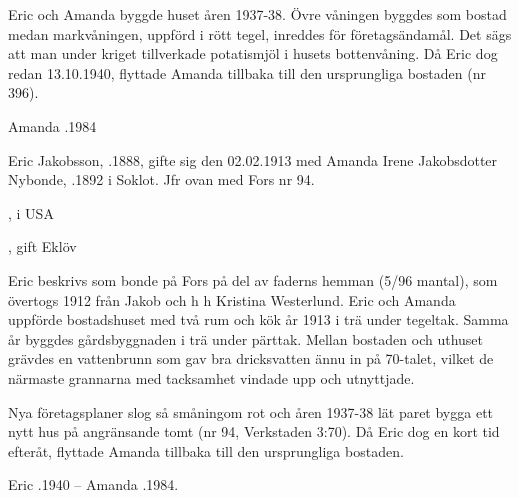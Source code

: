 Eric och Amanda byggde huset åren 1937-38. Övre våningen byggdes som bostad medan markvåningen, uppförd i rött tegel, inreddes för 	företagsändamål. Det sägs att man under kriget tillverkade potatismjöl i husets  bottenvåning. Då Eric dog redan 13.10.1940, flyttade Amanda tillbaka till den ursprungliga bostaden (nr 396).


Amanda .1984










Eric Jakobsson, .1888,  gifte sig den 02.02.1913 med Amanda Irene Jakobsdotter Nybonde, .1892 i Soklot. Jfr ovan med Fors nr 94.
\begin{jhchildren}
  \item {}, i USA
  \item {}
  \item {}, gift Eklöv
\end{jhchildren}

Eric beskrivs som bonde på Fors på del av faderns hemman (5/96 mantal), som övertogs 1912 från Jakob och h h Kristina Westerlund. Eric och Amanda uppförde bostadshuset med två rum och kök år 1913 i trä under tegeltak. Samma år byggdes gårdsbyggnaden i trä under pärttak. Mellan bostaden och uthuset grävdes en vattenbrunn som gav bra dricksvatten ännu in på 70-talet, vilket de närmaste grannarna med tacksamhet vindade upp och utnyttjade.

Nya företagsplaner slog så småningom rot och åren 1937-38 lät paret bygga ett nytt hus på angränsande tomt (nr 94, Verkstaden 3:70). Då Eric dog en kort tid efteråt, flyttade Amanda tillbaka till den ursprungliga bostaden.

Eric .1940  --  Amanda .1984.



